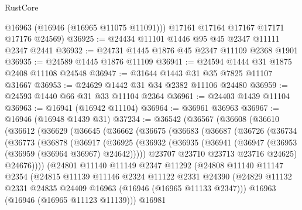 \begin{lexlean}{RustCore}
\begin{coremodule}
        @16963
        (@16946 (@16965 @11075 @11091)))
      @17161
      @17164
      @17167
      @17171
      @17176
      @24569)
@36925 := @24434 @11101 @1446 @95 @45 @2347 @11111 @2347 @2441
@36932 := @24731 @1445 @1876 @45 @2347 @11109 @2368 @1901
@36935 := @24589 @1445 @1876 @11109
@36941 := @24594 @1444 @31 @1875 @2408 @11108 @24548
@36947 := @31644 @1443 @31 @35 @7825 @11107 @31667
@36953 := @24629 @1442 @31 @34 @2382 @11106 @24480
@36959 := @24593 @1440 @66 @31 @33 @11104 @2364
@36961 := @24403 @1439 @11104
@36963 := @16941 (@16942 @11104)
@36964 := @36961 @36963
@36967 := @16946 (@16948 @1439 @31)
@37234 := @36542
    (@36567
      (@36608
        (@36610
          (@36612
            (@36629
              (@36645
                (@36662
                  (@36675
                    (@36683
                      (@36687
                        (@36726
                          (@36734
                            (@36773
                              (@36878
                                (@36917
                                  (@36925
                                    (@36932
                                      (@36935
                                        (@36941 (@36947 (@36953 (@36959 (@36964 @36967) @24642)))))
                                      @23707
                                      @23710
                                      @23713
                                      @23716
                                      @24625)
                                    @24676))))
                            (@24801
                              @11140
                              @11149
                              @2347
                              @11292
                              (@24808
                                @11140
                                @11147
                                @2354
                                (@24815
                                  @11139
                                  @11146
                                  @2324
                                  @11122
                                  @2331
                                  @24390
                                  (@24829
                                    @11132
                                    @2331
                                    @24835
                                    @24409
                                    @16963
                                    (@16946 (@16965 @11133 @2347)))
                                  @16963
                                  (@16946 (@16965 @11123 @11139)))
                                @16981

\end{coremodule}
\end{lexlean}
